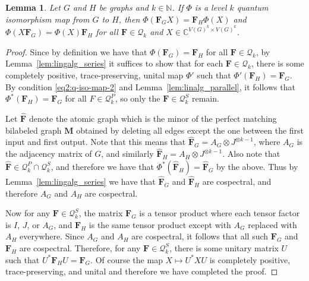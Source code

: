 \documentclass[11pt,a4paper]{article}
\theoremstyle{plain}
\newtheorem{lem}[thm]{Lemma}
\theoremstyle{remark}
\theoremstyle{definition}
\begin{document}
\begin{lem}\label{lem:multiplicative}
    Let $G$ and $H$ be graphs and $k \in \mathbb{N}$. If $\Phi$ is a level $k$ quantum isomorphism map from $G$ to $H$, then $\Phi(\boldsymbol{F}_GX) = \boldsymbol{F}_H\Phi(X)$ and $\Phi(X\boldsymbol{F}_G) = \Phi(X)\boldsymbol{F}_H$ for all $\boldsymbol{F} \in \mathcal{Q}_k$ and $X \in \mathbb{C}^{V(G)^k \times V(G)^k}$.
\end{lem}
\begin{proof}
    Since by definition we have that $\Phi(\boldsymbol{F}_G) = \boldsymbol{F}_H$ for all $\boldsymbol{F} \in \mathcal{Q}_k$, by Lemma~\ref{lem:lingalg_series} it suffices to show that for each $\boldsymbol{F} \in \mathcal{Q}_k$, there is some completely positive, trace-preserving, unital map $\Phi'$ such that $\Phi'(\boldsymbol{F}_H) = \boldsymbol{F}_G$. By condition \eqref{eq2:q-iso-map-2} and Lemma~\ref{lem:linalg_parallel}, it follows that $\Phi^*(\boldsymbol{F}_H) = \boldsymbol{F}_G$ for all $F \in \mathcal{Q}_k^P$, so only the $\boldsymbol{F} \in \mathcal{Q}_k^S$ remain.
    
    Let $\hat{\boldsymbol{F}}$ denote the atomic graph which is the minor of the perfect matching bilabeled graph $\mathbf{M}$ obtained by deleting all edges except the one between the first input and first output. Note that this means that $\hat{\boldsymbol{F}}_G = A_G \otimes J^{\otimes k-1}$, where $A_G$ is the adjacency matrix of $G$, and similarly $\hat{\boldsymbol{F}}_H = A_H \otimes J^{\otimes k-1}$. Also note that $\hat{\boldsymbol{F}} \in \mathcal{Q}_k^P \cap \mathcal{Q}_k^S$, and therefore we have that $\Phi^*(\hat{\boldsymbol{F}}_H) = \hat{\boldsymbol{F}}_G$ by the above. Thus by Lemma~\ref{lem:lingalg_series} we have that $\hat{\boldsymbol{F}}_G$ and $\hat{\boldsymbol{F}}_H$ are cospectral, and therefore $A_G$ and $A_H$ are cospectral.

    Now for any $\boldsymbol{F} \in \mathcal{Q}_k^S$, the matrix $\boldsymbol{F}_G$ is a tensor product where each tensor factor is $I$, $J$, or $A_G$, and $\boldsymbol{F}_H$ is the same tensor product except with $A_G$ replaced with $A_H$ everywhere. Since $A_G$ and $A_H$ are cospectral, it follows that all such $\boldsymbol{F}_G$ and $\boldsymbol{F}_H$ are cospectral. Therefore, for any $\boldsymbol{F} \in \mathcal{Q}_k^S$, there is some unitary matrix $U$ such that $U^* \boldsymbol{F}_H U = \boldsymbol{F}_G$. Of course the map $X \mapsto U^* X U$ is completely positive, trace-preserving, and unital and therefore we have completed the proof.
\end{proof}
\end{document}
